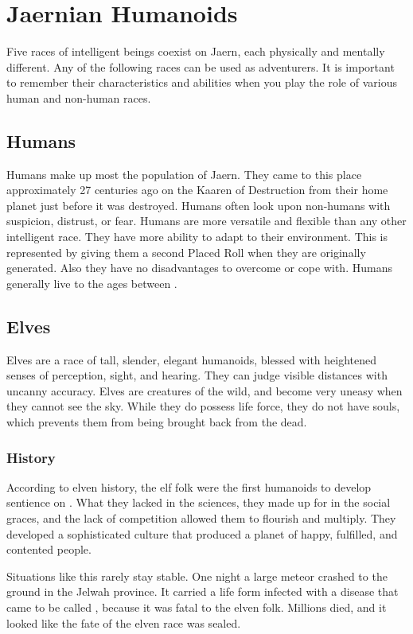 \chapter{Jaernian Humanoids}
\label{ch:jaern-humanoids}
\setlength{\columnsep}{\defcolwidth}\begin{multicols*}{2}
Five races of intelligent beings coexist on Jaern, each physically and mentally different. Any of the following races can be used as adventurers. It is important to remember their characteristics and abilities when you play the role of various human and non-human races.
\section{Humans}
Humans make up most the population of Jaern. They came to this place approximately 27 centuries ago on the Kaaren of Destruction from their home planet  just before it was destroyed. Humans often look upon non-humans with suspicion, distrust, or fear. Humans are more versatile and flexible than any other intelligent race. They have more ability to adapt to their environment. This is represented by giving them a second Placed Roll when they are originally generated. Also they have no disadvantages to overcome or cope with. Humans generally live to the ages between .
\makeline
\section{Elves}
Elves are a race of tall, slender, elegant humanoids, blessed with heightened senses of perception, sight, and hearing. They can judge visible distances with uncanny accuracy. Elves are creatures of the wild, and become very uneasy when they cannot see the sky. While they do possess life force, they do not have souls, which prevents them from being brought back from the dead.
\subsection{History}
According to elven history, the elf folk were the first humanoids to develop sentience on . What they lacked in the sciences, they made up for in the social graces, and the lack of competition allowed them to flourish and multiply. They developed a sophisticated culture that produced a planet of happy, fulfilled, and contented people.

Situations like this rarely stay stable. One night a large meteor crashed to the ground in the Jelwah province. It carried a life form infected with a disease that came to be
called , because it was fatal to the elven folk. Millions died, and it looked like the fate of the elven race was sealed.


\end{multicols*}

